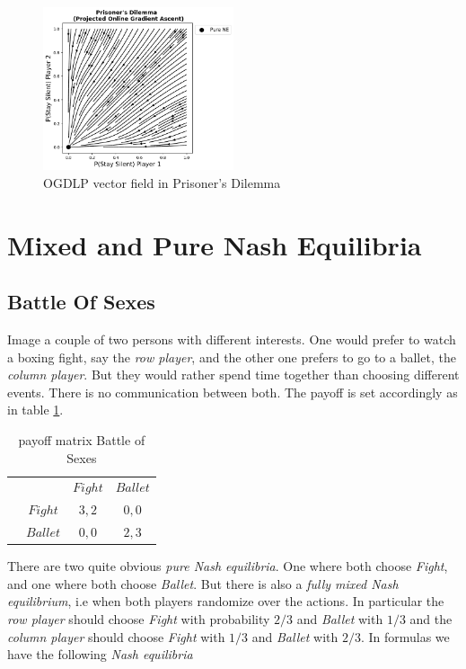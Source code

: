 \begin{figure}[H]
    \centering
    \includegraphics[width=0.5\textwidth]{logos/Prisoners3.png}
    \caption{OGDLP vector field in Prisoner's Dilemma}
    \label{fig:Prisoners3}
\end{figure}

\section{Mixed and Pure Nash Equilibria}\label{section:MixedandPureNashEquilibria}

\subsection{Battle Of Sexes}\label{subsection:battleOfSexes}

Image a couple of two persons with different interests. One would prefer to watch a boxing fight, say the \textit{row player}, and the other one prefers to go to a ballet, the \textit{column player}. But they would rather spend time together than choosing different events. There is no communication between both. The payoff is set accordingly as in table \ref{tab:payoffBattleOfSexes}.

\begin{table}[H]\centering
\setlength{\extrarowheight}{2pt}
\begin{tabular}{cc|c|c|}
  & \multicolumn{1}{c}{} & \multicolumn{1}{c}{$Fight$}  & \multicolumn{1}{c}{$Ballet$} \\\cline{3-4}
  & $Fight$ & $3,2$ & $0,0$ \\\cline{3-4}
  & $Ballet$ & $0,0$ & $2,3$ \\\cline{3-4}
\end{tabular}\caption{\label{tab:payoffBattleOfSexes}payoff matrix Battle of Sexes}
\end{table}

There are two quite obvious \textit{pure Nash equilibria}. One where both choose \textit{Fight}, and one where both choose \textit{Ballet}. But there is also a \textit{fully mixed Nash equilibrium}, i.e when both players randomize over the actions. In particular the \textit{row player} should choose \textit{Fight} with probability $2/3$ and \textit{Ballet} with $1/3$ and the \textit{column player} should choose \textit{Fight} with $1/3$ and \textit{Ballet} with $2/3$. In formulas we have the following \textit{Nash equilibria}

